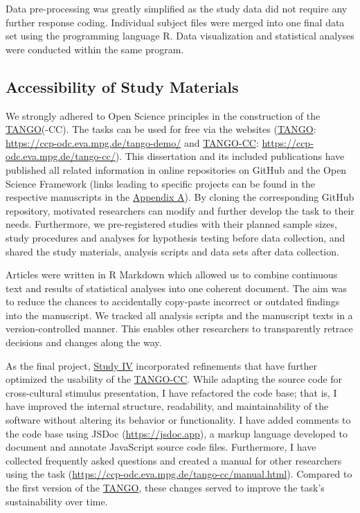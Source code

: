 \documentclass[
]{scrbook}
\begin{document}
Data pre-processing was greatly simplified as the study data did not require any further response coding. Individual subject files were merged into one final data set using the programming language R. Data visualization and statistical analyses were conducted within the same program.

\subsection{Accessibility of Study Materials}\label{approach-accessibility}

We strongly adhered to Open Science principles in the construction of the \hyperref[acronyms_TANGO]{TANGO}(-CC). The tasks can be used for free via the websites (\hyperref[acronyms_TANGO]{TANGO}: \mbox{\url{https://ccp-odc.eva.mpg.de/tango-demo/}} and \hyperref[acronyms_TANGO-CC]{TANGO-CC}: \mbox{\url{https://ccp-odc.eva.mpg.de/tango-cc/}}). This dissertation and its included publications have published all related information in online repositories on GitHub and the Open Science Framework (links leading to specific projects can be found in the respective manuscripts in the \hyperref[appendixA]{Appendix A}). By cloning the corresponding GitHub repository, motivated researchers can modify and further develop the task to their needs. Furthermore, we pre-registered studies with their planned sample sizes, study procedures and analyses for hypothesis testing before data collection, and shared the study materials, analysis scripts and data sets after data collection.

Articles were written in R Markdown which allowed us to combine continuous text and results of statistical analyses into one coherent document. The aim was to reduce the chances to accidentally copy-paste incorrect or outdated findings into the manuscript. We tracked all analysis scripts and the manuscript texts in a version-controlled manner. This enables other researchers to transparently retrace decisions and changes along the way.

As the final project, \hyperref[studyIV]{Study IV} incorporated refinements that have further optimized the usability of the \hyperref[acronyms_TANGO-CC]{TANGO-CC}. While adapting the source code for cross-cultural stimulus presentation, I have refactored the code base; that is, I have improved the internal structure, readability, and maintainability of the software without altering its behavior or functionality. I have added comments to the code base using JSDoc (\mbox{\url{https://jsdoc.app}}), a markup language developed to document and annotate JavaScript source code files. Furthermore, I have collected frequently asked questions and created a manual for other researchers using the task (\mbox{\url{https://ccp-odc.eva.mpg.de/tango-cc/manual.html}}). Compared to the first version of the \hyperref[acronyms_TANGO]{TANGO}, these changes served to improve the task's sustainability over time.
\end{document}
